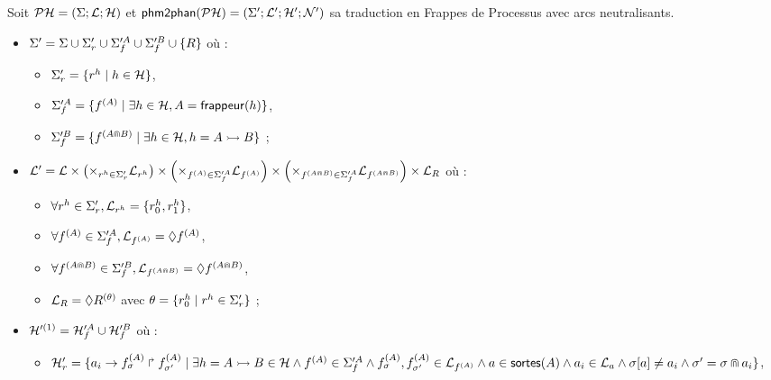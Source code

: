 \begin{definition}
  Soit $\mathcal{PH} = (\Sigma; \mathcal{L}; \mathcal{H})$ et $\mathsf{phm2phan}(\mathcal{PH}) = (\Sigma'; \mathcal{L}'; \mathcal{H}'; \mathcal{N}')$
  sa traduction en Frappes de Processus avec arcs neutralisants.
  \begin{itemize}
    \item $\Sigma' = \Sigma \cup \Sigma'_{r} \cup \Sigma'^A_{f} \cup
      \Sigma'^B_{f} \cup \{ R \}$ où :
      \begin{itemize}
        \item $\Sigma'_{r} = \{ r^{h} \mid h \in \mathcal{H} \}$,
        \item $\Sigma'^A_{f} = \{ f^{(A)} \mid \exists h \in \mathcal{H}, A = \mathsf{frappeur}(h) \}$,
        \item $\Sigma'^B_{f} = \{ f^{(A \Cap B)} \mid
          \exists h \in \mathcal{H}, h = \mbox{$A \rightarrowtail B$} \}$ ;
      \end{itemize}
    \item $\mathcal{L}' = \mathcal{L} \times
      \left( \times_{r^{h} \in \Sigma'_{r}} \mathcal{L}_{r^{h}} \right) \times
      \left( \times_{f^{(A)} \in \Sigma'^A_{f}} \mathcal{L}_{f^{(A)}} \right) \times
      \left( \times_{f^{(A \Cap B)} \in \Sigma'^A_{f}} \mathcal{L}_{f^{(A \Cap B)}} \right) \times
      \mathcal{L}_R$ où :
      \begin{itemize}
        \item $\forall r^{h} \in \Sigma'_{r}, \mathcal{L}_{r^{h}} = \{ r^{h}_0, r^{h}_1 \}$,
        \item $\forall f^{(A)} \in \Sigma'^A_{f}, \mathcal{L}_{f^{(A)}} = \lozenge f^{(A)}$,
        \item $\forall f^{(A \Cap B)} \in \Sigma'^B_{f}, \mathcal{L}_{f^{(A \Cap B)}} = \lozenge f^{(A \Cap B)}$,
        \item $\mathcal{L}_R = \lozenge R^{(\theta)}$
          avec $\theta = \{ r^{h}_0 \mid r^{h} \in \Sigma'_{r} \}$ ;
      \end{itemize}
    \item $\mathcal{H}'^{(1)} = \mathcal{H}'^A_{f} \cup \mathcal{H}'^B_{f}$ où :
      \begin{itemize}
        \item $\mathcal{H}'_{r} = \{ a_i\rightarrow f^{(A)}_\sigma\Rsh f^{(A)}_{\sigma'} \mid
          \exists h = \mbox{$A \rightarrowtail B$} \in \mathcal{H} \wedge
          f^{(A)} \in \Sigma'^A_{f} \wedge
          f^{(A)}_\sigma , f^{(A)}_{\sigma'} \in \mathcal{L}_{f^{(A)}} \wedge
          a \in \mathsf{sortes}(A) \wedge a_i \in \mathcal{L}_a \wedge
          {\sigma[a]} \neq a_i \wedge \sigma' = \sigma \Cap a_i \}$,

\end{itemize}
\end{itemize}
\end{definition}
